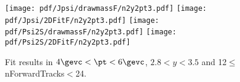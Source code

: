 \begin{figure}[H]
\begin{center}
\texttt{[image: pdf/Jpsi/drawmassF/n2y2pt3.pdf]}
\texttt{[image: pdf/Jpsi/2DFitF/n2y2pt3.pdf]}
\vspace*{-0.5cm}
\texttt{[image: pdf/Psi2S/drawmassF/n2y2pt3.pdf]}
\texttt{[image: pdf/Psi2S/2DFitF/n2y2pt3.pdf]}
\vspace*{-0.5cm}
\end{center}
\caption{Fit results in $4\gevc<\pt<6\gevc$, $2.8<y<3.5$ and 12$\leq$nForwardTracks$<$24.}
\label{Fitn2y2pt3}
\end{figure}
